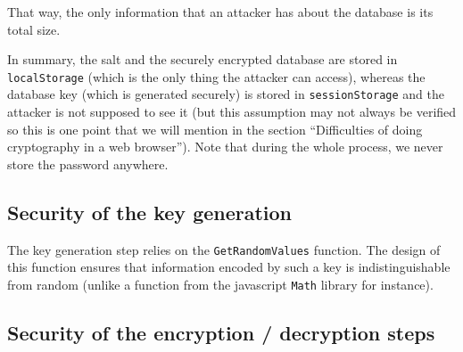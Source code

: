 \documentclass[10pt,twocolumn]{article}
\begin{document}
That way, the only information that an attacker has about the database is its total size.

In summary, the salt and the securely encrypted database are stored in \texttt{localStorage} (which is the only thing the attacker can access), whereas the database key (which is generated securely) is stored in \texttt{sessionStorage} and the attacker is not supposed to see it (but this assumption may not always be verified so this is one point that we will mention in the section ``Difficulties of doing cryptography in a web browser''). Note that during the whole process, we never store the password anywhere.




\subsection{Security of the key generation}

The key generation step relies on the \texttt{GetRandomValues} function. The design of this function ensures that information encoded by such a key is indistinguishable from random (unlike a function from the javascript \texttt{Math} library for instance).





\subsection{Security of the encryption / decryption steps}\label{security-encryption-decryption}
\end{document}
